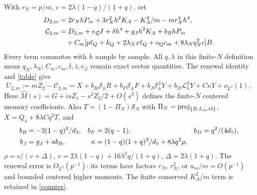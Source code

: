 \documentclass[11pt,a4paper]{article}
\newcommand{\Jh}{\mathcal J_h}
\newcommand{\Lh}{\mathcal L_h}
\begin{document}
With $r_N=p/m$, $c=2\lambda(1-q)/(1+q)$, set
\begin{align}
 D_{2,m}&=2r_NhP_m+3r_N^2h^2K_A-K_A^2/m-mr_N^4h^4,\notag\\
 \mathcal C_{2,m}&=D_{2,m}+e_{\mathcal Q}I+\delta h^4
                 +g_Jh^2K_A+b_RhP_m\notag\\
 &\quad+C_m[p\ell_Q+k_Q+2\lambda_Nx\ell_Q+o_Qc_m
                           +8\lambda_Nq_N^2c]B.\label{counter}
\end{align}
Every term commutes with $h$ sample by sample. All $q,\lambda$
in this finite-$N$ definition mean $q_N,\lambda_N$; $C_m,c_m,
\bar t,\bar z,e_{\mathcal Q}$ remain exact sector quantities.
The renewal identity and \eqref{table} give
\begin{equation}
 U_{2,m}:=mZ_2-\mathcal C_{2,m}
 =X+b_R\Jh R+b_F\Jh F+b_J\Jh^2Y+b_D\Lh^2Y+C\kappa Y+o_{L^2}(1),
\end{equation}
Here $\widehat M(s)=G+isZ_1-s^2Z_2/2+O(s^3)$ defines the
finite-$N$ centered memory coefficients. Also
$T=(1-\Pi_N)\mathcal S_N$ with
$\Pi_N=\operatorname{proj}_{\{B,L_{\rm in},O\}}$,
$X=Q_4+8\lambda Cq^2T$, and
\begin{align}
 b_R&=-2(1-q)^2/d_3,& b_F&=2(q-1),& b_D&=q^2/(4d_5),\notag\\
 b_J&=g_J+ab_R,&\kappa&=(1-q)(1+q)^2/d_5+8\lambda q^2\rho,
\end{align}
$\rho=v/(v+\Delta)$, $v=2\lambda(1-q)+16\lambda^2q/(1+q)$,
$\Delta=2\lambda(1+q)$. The renewal error is $O_{L^2}(p^{-1})$:
its terms have factors $r_N$, $r_N^2$, or $a_m/m=O(p^{-1})$
and bounded centered higher moments. The finite conserved
$K_A^2/m$ term is retained in \eqref{counter}.

\newpage
\end{document}
